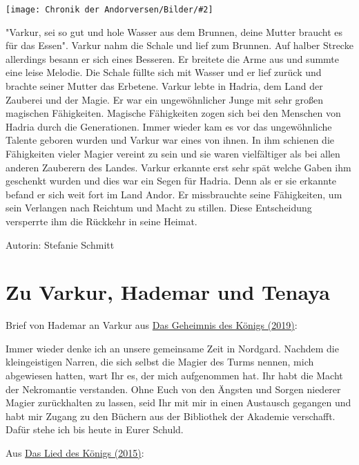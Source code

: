 \documentclass[10pt, a4paper, oneside]{book}
\newcommand{\fillbreak}{\vspace*{\fill}\columnbreak}
\newcommand{\refprodukt}[1]{\hyperref[Produkt: #1]{#1}}
\newcommand{\bildmitts}[2][height=0.32\textwidth,width=0.48\textwidth,keepaspectratio]{%
    \begin{center}
        \texttt{[image: Chronik der Andorversen/Bilder/\#2]}
    \end{center}
}
\begin{document}
\begin{multicols}{2}
\bildmitts{Der Dunkle Magier Varkur Bild 1.jpg}

"Varkur, sei so gut und hole Wasser aus dem Brunnen, deine Mutter braucht es für das Essen". Varkur nahm die Schale und lief zum Brunnen. Auf halber Strecke allerdings besann er sich eines Besseren. Er breitete die Arme aus und summte eine leise Melodie. Die Schale füllte sich mit Wasser und er lief zurück und brachte seiner Mutter das Erbetene. Varkur lebte in Hadria, dem Land der Zauberei und der Magie. Er war ein ungewöhnlicher Junge mit sehr großen magischen Fähigkeiten.  Magische Fähigkeiten zogen sich bei den Menschen von Hadria durch die Generationen. Immer wieder kam es vor das ungewöhnliche Talente geboren wurden und Varkur war eines von ihnen. In ihm schienen die Fähigkeiten vieler Magier vereint zu sein und sie waren vielfältiger als bei allen anderen Zauberern des Landes. Varkur erkannte erst sehr spät welche Gaben ihm geschenkt wurden und dies war ein Segen für Hadria. Denn als er sie erkannte befand er sich weit fort im Land Andor.  Er missbrauchte seine Fähigkeiten, um sein Verlangen nach Reichtum und Macht zu stillen. Diese Entscheidung versperrte ihm die Rückkehr in seine Heimat.\bigskip

Autorin: Stefanie Schmitt






\fillbreak
\section{Zu Varkur, Hademar und Tenaya}

\begin{center}
     Brief von Hademar an Varkur  aus \refprodukt{Das Geheimnis des Königs (2019)}:
\end{center}

Immer wieder denke ich an unsere gemeinsame Zeit in Nordgard. Nachdem die kleingeistigen Narren, die sich selbst die Magier des Turms nennen, mich abgewiesen hatten, wart Ihr es, der mich aufgenommen hat. Ihr habt die Macht der Nekromantie verstanden. Ohne Euch von den Ängsten und Sorgen niederer Magier zurückhalten zu lassen, seid Ihr mit mir in einen Austausch gegangen und habt mir Zugang zu den Büchern aus der Bibliothek der Akademie verschafft. Dafür stehe ich bis heute in Eurer Schuld.

\begin{center}
     Aus \refprodukt{Das Lied des Königs (2015)}:
\end{center}


\end{multicols}
\end{document}
